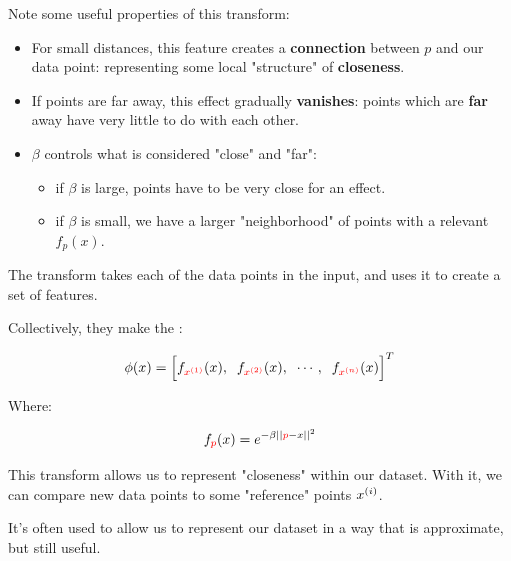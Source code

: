             Note some useful properties of this transform:
            \begin{itemize}
                \item For small distances, this feature creates a \textbf{connection} between $p$ and our data point: representing some local "structure" of \textbf{closeness}.
                \item If points are far away, this effect gradually \textbf{vanishes}: points which are \textbf{far} away have very little to do with each other.
                \item $\beta$ controls what is considered "close" and "far": 
                    \begin{itemize}
                        \item if $\beta$ is large, points have to be very close for an effect.
                        \item if $\beta$ is small, we have a larger "neighborhood" of points with a relevant $f_p(x)$.\\
                    \end{itemize}
            \end{itemize}

            \begin{definition}
                The  transform takes each of the data points in the input, and uses it to create a set of  features. 

                Collectively, they make the :

                \begin{equation*}
                    \phi(x) = 
                    \Big[
                    f_{\textcolor{red}{x^{(1)}}}(x), \;\; 
                    f_{\textcolor{red}{x^{(2)}}}(x), \;\; 
                    \cdots, \;\; 
                    f_{\textcolor{red}{x^{(n)}}}(x)
                    \Big]^T
                \end{equation*}

                Where:

                \begin{equation*}
                    f_{\textcolor{red}{p}}(x) = e^{-\beta ||\textcolor{red}{p}-x||^2 }
                \end{equation*}

                This transform allows us to represent "closeness" within our dataset. With it, we can compare new data points to some "reference" points $x^{(i)}$.
                
                It's often used to allow us to represent our dataset in a way that is approximate, but still useful.
            \end{definition}


